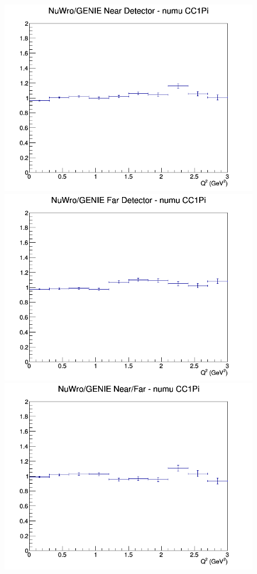 \begin{figure}[h]
\endminipage
\newline
{}
\includegraphics[width=\linewidth]{eff_Q2/GAr/ratios/CC1Pi_NuWro_GENIE_numu_near_Q2.png}
\endminipage
{}
\includegraphics[width=\linewidth]{eff_Q2/GAr/ratios/CC1Pi_NuWro_GENIE_numu_far_Q2.png}
\endminipage
{}
\includegraphics[width=\linewidth]{eff_Q2/GAr/ratios/CC1Pi_NuWro_GENIE_numu_NF_Q2.png}
\endminipage
\newline
\end{figure}
\clearpage
